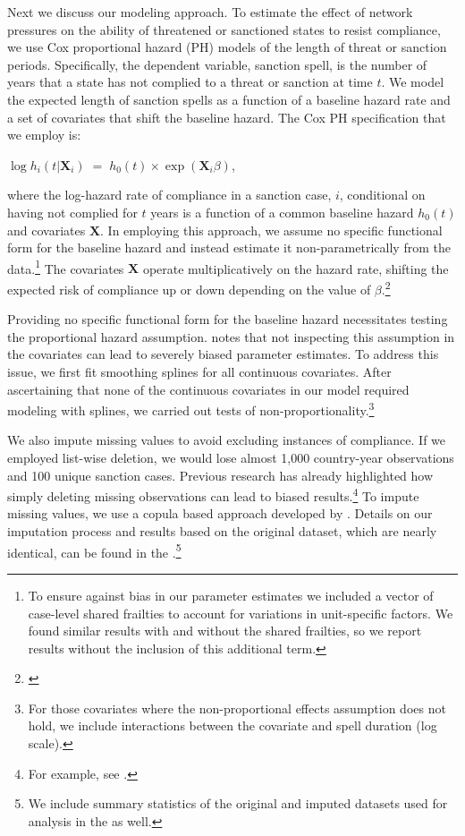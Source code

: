 Next we discuss our modeling approach. To estimate the effect of network pressures on the ability of threatened or sanctioned states to resist compliance, we use Cox proportional hazard (PH) models of the length of threat or sanction periods. Specifically, the dependent variable, sanction spell, is the number of years that a state has not complied to a threat or sanction at time $t$. We model the expected length of sanction spells as a function of a baseline hazard rate and a set of covariates that shift the baseline hazard. The Cox PH specification that we employ is:

\begin{center}
	$\log h_{i}(t | \boldsymbol{X}_{i}) \; = \; h_{0}(t) \times \exp(\boldsymbol{X}_{i} \beta)$,
\end{center}

where the log-hazard rate of compliance in a sanction case, $i$, conditional on having not complied for $t$ years is a function of a common baseline hazard $h_{0}(t)$ and covariates $\boldsymbol{X}$. In employing this approach, we assume no specific functional form for the baseline hazard and instead estimate it non-parametrically from the data.\footnote{To ensure against bias in our parameter estimates we included a vector of case-level shared frailties to account for variations in unit-specific factors. We found similar results with and without the shared frailties, so we report results without the inclusion of this additional term.}  The covariates $\boldsymbol{X}$ operate multiplicatively on the hazard rate, shifting the expected risk of compliance up or down depending on the value of $\beta$.\footnote{\cite{crespo2013political}}

Providing no specific functional form for the baseline hazard necessitates testing the proportional hazard assumption. \citet{keele2010proportionally} notes that not inspecting this assumption in the covariates can lead to severely biased parameter estimates. To address this issue, we first fit smoothing splines for all continuous covariates. After ascertaining that none of the continuous covariates in our model required modeling with splines, we carried out tests of non-proportionality.\footnote{For those covariates where the non-proportional effects assumption does not hold, we include interactions between the covariate and spell duration (log scale).} 

We also impute missing values to avoid excluding instances of compliance. If we employed list-wise deletion, we would lose almost 1,000 country-year observations and 100 unique sanction cases. Previous research has already highlighted how simply deleting missing observations can lead to biased results.\footnote{For example, see \citealp{rubin1976inference,honaker2010missing}.} To impute missing values, we use a copula based approach developed by \citet{hoff:2007}. Details on our imputation process and results based on the original dataset, which are nearly identical, can be found in the .\footnote{We include summary statistics of the original and imputed datasets used for analysis in the  as well. } 

